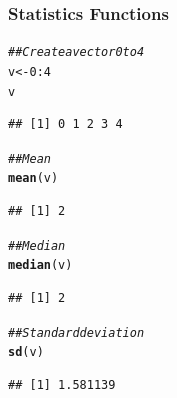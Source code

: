 \documentclass{beamer}\usepackage[]{graphicx}\usepackage[]{xcolor}
\makeatletter
\newcommand{\hlnum}[1]{\textcolor[rgb]{0.686,0.059,0.569}{#1}}%
\newcommand{\hlcom}[1]{\textcolor[rgb]{0.678,0.584,0.686}{\textit{#1}}}%
\newcommand{\hlopt}[1]{\textcolor[rgb]{0,0,0}{#1}}%
\newcommand{\hlstd}[1]{\textcolor[rgb]{0.345,0.345,0.345}{#1}}%
\newcommand{\hlkwb}[1]{\textcolor[rgb]{0.69,0.353,0.396}{#1}}%
\newcommand{\hlkwd}[1]{\textcolor[rgb]{0.737,0.353,0.396}{\textbf{#1}}}%
\newenvironment{kframe}{%
 \def\at@end@of@kframe{}%
 \ifinner\ifhmode%
  \def\at@end@of@kframe{\end{minipage}}%
  \begin{minipage}{\columnwidth}%
 \fi\fi%
 \def\FrameCommand##1{\hskip\@totalleftmargin \hskip-\fboxsep
 \colorbox{shadecolor}{##1}\hskip-\fboxsep
     \hskip-\linewidth \hskip-\@totalleftmargin \hskip\columnwidth}%
 \MakeFramed {\advance\hsize-\width
   \@totalleftmargin\z@ \linewidth\hsize
   \@setminipage}}%
 {\par\unskip\endMakeFramed%
 \at@end@of@kframe}
\newenvironment{knitrout}{}{} %
\makeatother
\begin{document}
\begin{frame}[fragile]\frametitle{Statistics Functions}
\begin{knitrout}\footnotesize
{}\color{fgcolor}\begin{kframe}
\begin{alltt}
\hlcom{## Create a vector 0 to 4}
\hlstd{v} \hlkwb{<-} \hlnum{0}\hlopt{:}\hlnum{4}
\hlstd{v}
\end{alltt}
\begin{verbatim}
## [1] 0 1 2 3 4
\end{verbatim}
\begin{alltt}
\hlcom{## Mean}
\hlkwd{mean}\hlstd{(v)}
\end{alltt}
\begin{verbatim}
## [1] 2
\end{verbatim}
\begin{alltt}
\hlcom{## Median}
\hlkwd{median}\hlstd{(v)}
\end{alltt}
\begin{verbatim}
## [1] 2
\end{verbatim}
\begin{alltt}
\hlcom{## Standard deviation}
\hlkwd{sd}\hlstd{(v)}
\end{alltt}
\begin{verbatim}
## [1] 1.581139
\end{verbatim}
\end{kframe}
\end{knitrout}
\end{frame}
\end{document}
